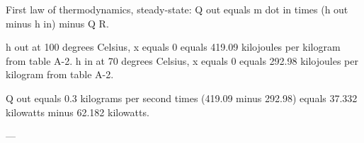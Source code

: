 First law of thermodynamics, steady-state:  
Q out equals m dot in times (h out minus h in) minus Q R.  

h out at 100 degrees Celsius, x equals 0 equals 419.09 kilojoules per kilogram from table A-2.  
h in at 70 degrees Celsius, x equals 0 equals 292.98 kilojoules per kilogram from table A-2.  

Q out equals 0.3 kilograms per second times (419.09 minus 292.98) equals 37.332 kilowatts minus 62.182 kilowatts.  

---